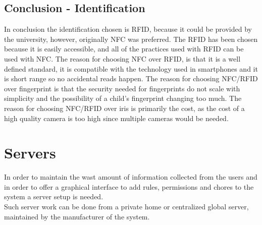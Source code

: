 
\subsection{Conclusion - Identification}
In conclusion the identification chosen is RFID, because it could be provided by the university, however, originally NFC was preferred. 
The RFID has been chosen because it is easily accessible, and all of the practices used with RFID can be used with NFC. The reason for choosing NFC over RFID, is that it is a well defined standard, it is compatible with the technology used in smartphones and it is short range so no accidental reads happen. The reason for choosing NFC/RFID over fingerprint is that the security needed for fingerprints do not scale with simplicity and the possibility of a child's fingerprint changing too much. The reason for choosing NFC/RFID over iris is primarily the cost, as the cost of a high quality camera is too high since multiple cameras would be needed.

\section{Servers}
In order to maintain the wast amount of information collected from the users and in order to offer a graphical interface to add rules, permissions and chores to the system a server setup is needed.\\
Such server work can be done from a private home or centralized global server, maintained by the manufacturer of the system.\\

